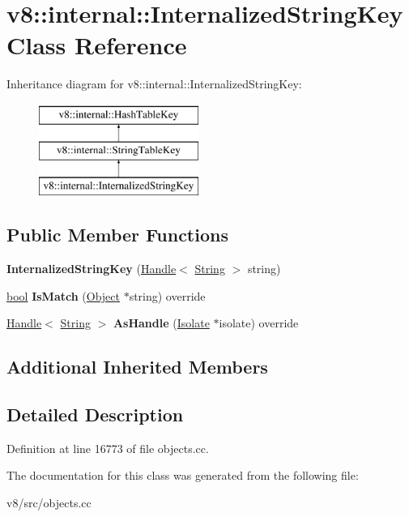 \hypertarget{classv8_1_1internal_1_1InternalizedStringKey}{}\section{v8\+:\+:internal\+:\+:Internalized\+String\+Key Class Reference}
\label{classv8_1_1internal_1_1InternalizedStringKey}
Inheritance diagram for v8\+:\+:internal\+:\+:Internalized\+String\+Key\+:\begin{figure}[H]
\begin{center}
\leavevmode
\includegraphics[height=3.000000cm]{classv8_1_1internal_1_1InternalizedStringKey}
\end{center}
\end{figure}
\subsection*{Public Member Functions}
\begin{DoxyCompactItemize}
\item 
\mbox{\label{classv8_1_1internal_1_1InternalizedStringKey_aba358506b7265a8c8ac9b75a3d2394aa}} 
{\bfseries Internalized\+String\+Key} (\mbox{\hyperlink{classv8_1_1internal_1_1Handle}{Handle}}$<$ \mbox{\hyperlink{classv8_1_1internal_1_1String}{String}} $>$ string)
\item 
\mbox{\label{classv8_1_1internal_1_1InternalizedStringKey_ade94f1971552672477606b2009ebc850}} 
\mbox{\hyperlink{classbool}{bool}} {\bfseries Is\+Match} (\mbox{\hyperlink{classv8_1_1internal_1_1Object}{Object}} $\ast$string) override
\item 
\mbox{\label{classv8_1_1internal_1_1InternalizedStringKey_a3561eae09de121af1fc49330c58c9aff}} 
\mbox{\hyperlink{classv8_1_1internal_1_1Handle}{Handle}}$<$ \mbox{\hyperlink{classv8_1_1internal_1_1String}{String}} $>$ {\bfseries As\+Handle} (\mbox{\hyperlink{classv8_1_1internal_1_1Isolate}{Isolate}} $\ast$isolate) override
\end{DoxyCompactItemize}
\subsection*{Additional Inherited Members}


\subsection{Detailed Description}


Definition at line 16773 of file objects.\+cc.



The documentation for this class was generated from the following file\+:\begin{DoxyCompactItemize}
\item 
v8/src/objects.\+cc\end{DoxyCompactItemize}
